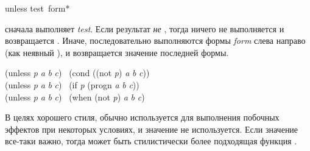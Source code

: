 \begin{defmac}
unless test {\,form}*

сначала выполняет \emph{test}. Если результат \emph{не} {\false}, тогда ничего не
выполняется и возвращается {\false}.
Иначе, последовательно выполняются формы \emph{form}
слева направо (как неявный ), и возвращается значение последней
формы.
\begin{lisp}
(unless \emph{p} \emph{a} \emph{b} \emph{c}) \EQ\ (cond ((not \emph{p}) \emph{a} \emph{b} \emph{c})) \\
(unless \emph{p} \emph{a} \emph{b} \emph{c}) \EQ\ (if \emph{p} {\false} (progn \emph{a} \emph{b} \emph{c})) \\
(unless \emph{p} \emph{a} \emph{b} \emph{c}) \EQ\ (when (not \emph{p}) \emph{a} \emph{b} \emph{c})
\end{lisp}
В целях хорошего стиля,  обычно используется для выполнения побочных
эффектов при некоторых условиях, и значение  не используется.
Если значение все-таки важно, тогда может быть стилистически более подходящая
функция .
\end{defmac}


